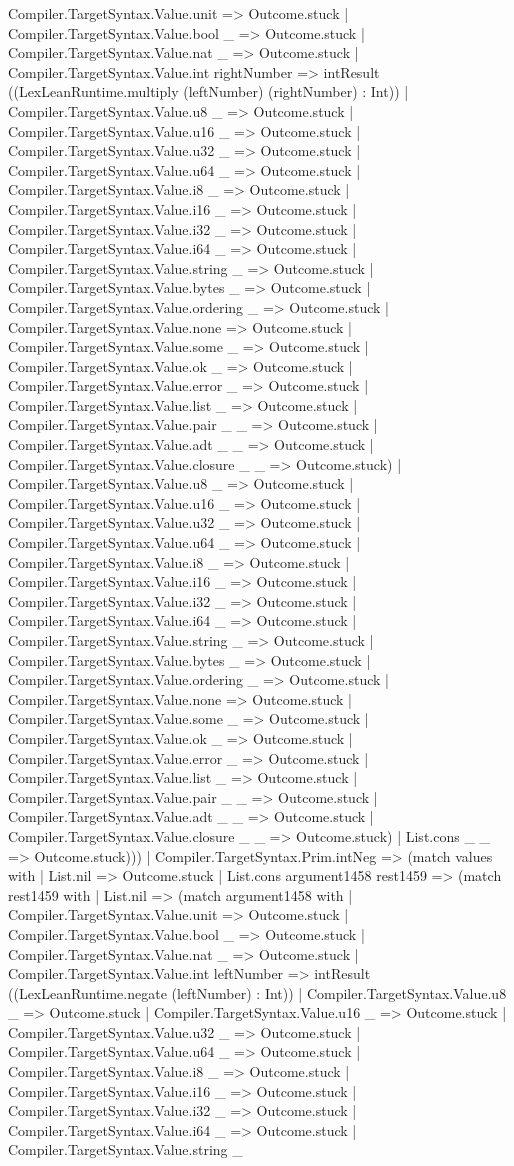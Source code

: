 \documentclass[11pt]{article}
\begin{document}
Compiler.TargetSyntax.Value.unit => Outcome.stuck | Compiler.TargetSyntax.Value.bool \_ => Outcome.stuck | Compiler.TargetSyntax.Value.nat \_ => Outcome.stuck | Compiler.TargetSyntax.Value.int rightNumber => intResult ((LexLeanRuntime.multiply (leftNumber) (rightNumber) : Int)) | Compiler.TargetSyntax.Value.u8 \_ => Outcome.stuck | Compiler.TargetSyntax.Value.u16 \_ => Outcome.stuck | Compiler.TargetSyntax.Value.u32 \_ => Outcome.stuck | Compiler.TargetSyntax.Value.u64 \_ => Outcome.stuck | Compiler.TargetSyntax.Value.i8 \_ => Outcome.stuck | Compiler.TargetSyntax.Value.i16 \_ => Outcome.stuck | Compiler.TargetSyntax.Value.i32 \_ => Outcome.stuck | Compiler.TargetSyntax.Value.i64 \_ => Outcome.stuck | Compiler.TargetSyntax.Value.string \_ => Outcome.stuck | Compiler.TargetSyntax.Value.bytes \_ => Outcome.stuck | Compiler.TargetSyntax.Value.ordering \_ => Outcome.stuck | Compiler.TargetSyntax.Value.none => Outcome.stuck | Compiler.TargetSyntax.Value.some \_ => Outcome.stuck | Compiler.TargetSyntax.Value.ok \_ => Outcome.stuck | Compiler.TargetSyntax.Value.error \_ => Outcome.stuck | Compiler.TargetSyntax.Value.list \_ => Outcome.stuck | Compiler.TargetSyntax.Value.pair \_ \_ => Outcome.stuck | Compiler.TargetSyntax.Value.adt \_ \_ => Outcome.stuck | Compiler.TargetSyntax.Value.closure \_ \_ => Outcome.stuck) | Compiler.TargetSyntax.Value.u8 \_ => Outcome.stuck | Compiler.TargetSyntax.Value.u16 \_ => Outcome.stuck | Compiler.TargetSyntax.Value.u32 \_ => Outcome.stuck | Compiler.TargetSyntax.Value.u64 \_ => Outcome.stuck | Compiler.TargetSyntax.Value.i8 \_ => Outcome.stuck | Compiler.TargetSyntax.Value.i16 \_ => Outcome.stuck | Compiler.TargetSyntax.Value.i32 \_ => Outcome.stuck | Compiler.TargetSyntax.Value.i64 \_ => Outcome.stuck | Compiler.TargetSyntax.Value.string \_ => Outcome.stuck | Compiler.TargetSyntax.Value.bytes \_ => Outcome.stuck | Compiler.TargetSyntax.Value.ordering \_ => Outcome.stuck | Compiler.TargetSyntax.Value.none => Outcome.stuck | Compiler.TargetSyntax.Value.some \_ => Outcome.stuck | Compiler.TargetSyntax.Value.ok \_ => Outcome.stuck | Compiler.TargetSyntax.Value.error \_ => Outcome.stuck | Compiler.TargetSyntax.Value.list \_ => Outcome.stuck | Compiler.TargetSyntax.Value.pair \_ \_ => Outcome.stuck | Compiler.TargetSyntax.Value.adt \_ \_ => Outcome.stuck | Compiler.TargetSyntax.Value.closure \_ \_ => Outcome.stuck) | List.cons \_ \_ => Outcome.stuck))) | Compiler.TargetSyntax.Prim.intNeg => (match values with | List.nil => Outcome.stuck | List.cons argument1458 rest1459 => (match rest1459 with | List.nil => (match argument1458 with | Compiler.TargetSyntax.Value.unit => Outcome.stuck | Compiler.TargetSyntax.Value.bool \_ => Outcome.stuck | Compiler.TargetSyntax.Value.nat \_ => Outcome.stuck | Compiler.TargetSyntax.Value.int leftNumber => intResult ((LexLeanRuntime.negate (leftNumber) : Int)) | Compiler.TargetSyntax.Value.u8 \_ => Outcome.stuck | Compiler.TargetSyntax.Value.u16 \_ => Outcome.stuck | Compiler.TargetSyntax.Value.u32 \_ => Outcome.stuck | Compiler.TargetSyntax.Value.u64 \_ => Outcome.stuck | Compiler.TargetSyntax.Value.i8 \_ => Outcome.stuck | Compiler.TargetSyntax.Value.i16 \_ => Outcome.stuck | Compiler.TargetSyntax.Value.i32 \_ => Outcome.stuck | Compiler.TargetSyntax.Value.i64 \_ => Outcome.stuck | Compiler.TargetSyntax.Value.string \_ 
\end{document}
